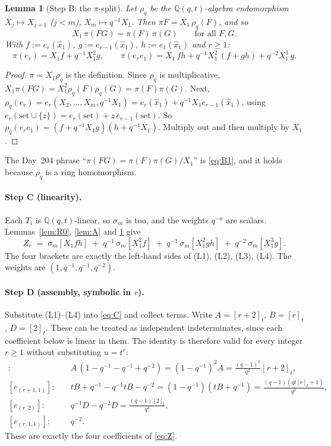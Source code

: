 \documentclass[11pt]{article}
\newcommand{\qint}[1]{[#1]_t}
\newcommand{\tl}{\widehat{x}_1}
\newcommand{\Qq}{\mathbb{Q}(q,t)}
\newtheorem{lemma}[theorem]{Lemma}
\theoremstyle{definition}
\begin{document}
\begin{lemma}[Step B: the $\pi$-split]\label{lem:B}
Let $\rho_q$ be the $\Qq$-algebra endomorphism $X_j\mapsto X_{j+1}$ ($j<m$),
$X_m\mapsto q^{-1}X_1$. Then $\pi F=X_1\,\rho_q(F)$, and so
\begin{equation}\label{eq:B1}
X_1\,\pi(FG)=\pi(F)\,\pi(G)\qquad\text{for all }F,G.
\end{equation}
With $f:=e_r(\tl)$, $g:=e_{r-1}(\tl)$, $h:=e_1(\tl)$ and $r\ge1$:
\begin{equation}\label{eq:split}
\pi(e_r)=X_1f+q^{-1}X_1^2g,\qquad
\pi(e_re_1)=X_1\,fh+q^{-1}X_1^2\,(f+gh)+q^{-2}X_1^3\,g .
\end{equation}
\end{lemma}
\begin{proof}
$\pi=X_1\rho_q$ is the definition. Since $\rho_q$ is multiplicative,
$X_1\pi(FG)=X_1^2\rho_q(F)\rho_q(G)=\pi(F)\pi(G)$. Next,
$\rho_q(e_r)=e_r(X_2,\dots,X_m,q^{-1}X_1)=e_r(\tl)+q^{-1}X_1e_{r-1}(\tl)$, using
$e_r(\text{set}\cup\{z\})=e_r(\text{set})+z\,e_{r-1}(\text{set})$. So
$\rho_q(e_re_1)=(f+q^{-1}X_1g)(h+q^{-1}X_1)$. Multiply out and then multiply by $X_1$.
\end{proof}
The Day~204 phrase ``$\pi(FG)=\pi(F)\pi(G)/X_1$'' is \eqref{eq:B1}, and it holds
because $\rho_q$ is a ring homomorphism.

\paragraph{Step C (linearity).} Each $T_i$ is $\Qq$-linear, so $\sigma_m$ is too, and the
weights $q^{-a}$ are scalars. Lemmas~\ref{lem:R0}, \ref{lem:A} and \ref{lem:B} give
\begin{equation}\label{eq:C}
Z_r \;=\; \sigma_m[X_1fh]\;+\;q^{-1}\,\sigma_m[X_1^2f]\;+\;q^{-1}\,\sigma_m[X_1^2gh]\;+\;q^{-2}\,\sigma_m[X_1^3g].
\end{equation}
The four brackets are exactly the left-hand sides of (L1), (L2), (L3), (L4). The weights are
$(1,q^{-1},q^{-1},q^{-2})$.

\paragraph{Step D (assembly, symbolic in $r$).} Substitute (L1)--(L4) into \eqref{eq:C} and
collect terms. Write $A=\qint{r+2}$, $B=\qint r$, $D=\qint2$. These can be treated as
independent indeterminates, since each coefficient below is linear in them. The identity
is therefore valid for every integer $r\ge1$ without substituting $u=t^r$:
\begin{align*}
[e_{r+2}]:&\quad A\,(1-q^{-1}-q^{-1}+q^{-2}) = (1-q^{-1})^2A=\tfrac{(q-1)^2}{q^2}\qint{r+2},\\
[e_{(r+1,1)}]:&\quad tB+q^{-1}-q^{-1}tB-q^{-2} = (1-q^{-1})(tB+q^{-1}) = \tfrac{(q-1)(qt\qint r+1)}{q^2},\\
[e_{(r,2)}]:&\quad q^{-1}D-q^{-2}D=\tfrac{(q-1)\qint2}{q^2},\\
[e_{(r,1,1)}]:&\quad q^{-2}.
\end{align*}
These are exactly the four coefficients of \eqref{eq:Z}.
\end{document}
